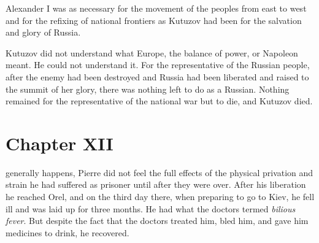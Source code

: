 Alexander I was as necessary for the movement of the peoples from
east to west and for the refixing of national frontiers as
Kutuzov had been for the salvation and glory of Russia.

Kutuzov did not understand what Europe, the balance of power, or
Napoleon meant. He could not understand it. For the
representative of the Russian people, after the enemy had been
destroyed and Russia had been liberated and raised to the summit
of her glory, there was nothing left to do as a Russian. Nothing
remained for the representative of the national war but to die,
and Kutuzov died.


\chapter*{Chapter XII}
\ifaudio 
{}
\fi

 generally happens, Pierre did not feel the full effects of the
physical privation and strain he had suffered as prisoner until
after they were over. After his liberation he reached Orel, and
on the third day there, when preparing to go to Kiev, he fell ill
and was laid up for three months. He had what the doctors termed
\emph{bilious fever}. But despite the fact that the doctors
treated him, bled him, and gave him medicines to drink, he
recovered.


